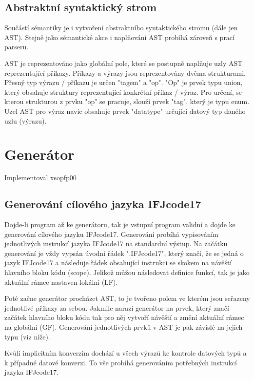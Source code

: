 \documentclass[11pt,a4paper]{article}
\begin{document}
    \subsection{Abstraktní syntaktický strom}
    Součástí sémantiky je i vytvoření abstraktního syntaktického stromu (dále jen AST). Stejně jako sémantické akce i naplňování AST probíhá zároveň s prací parseru.

    AST je reprezentováno jako globální pole, které se postupně naplňuje uzly AST reprezentující příkazy. Příkazy a výrazy jsou reprezentovány dvěma strukturami. Přesný typ výrazu / příkazu je určen "tagem" a "op". "Op" je prvek typu union, který obsahuje struktury reprezentující konkrétní příkaz / výraz. Pro určení, se kterou strukturou z prvku "op" se pracuje, slouží prvek "tag", který je typu enum. Uzel AST pro výraz navíc obsahuje prvek "datatype" určující datový typ daného uzlu (výrazu). \cite{AST:AST_in_C}

	\newpage


\section{Generátor}
    Implementoval xsopfp00

    \subsection{Generování cílového jazyka IFJcode17}
    Dojde-li program až ke generátoru, tak je vstupní program validní a dojde ke generování cílového jazyku IFJcode17. Generování probíhá vypisováním jednotlivých instrukcí jazyka IFJcode17 na standardní výstup. Na začátku generování je vždy vypsán úvodní řádek ".IFJcode17", který značí, že se jedná o jazyk IFJcode17 a následuje řádek obsahující instrukci se skokem na návěští hlavního bloku kódu (scope). Jelikož můžou následovat definice funkcí, tak je jako aktuální rámce nastaven lokální (LF).


    Poté začne generátor procházet AST, to je tvořeno polem ve kterém jsou seřazeny jednotlivé příkazy za sebou. Jakmile narazí generátor na prvek, který značí začátek hlavního bloku kódu tak pro něj vytvoří návěští a změní aktuální rámec na globální (GF). Generování jednotlivých prvků v AST je pak závislé na jejich typu (viz níže).

    Kvůli implicitním konverzím dochází u všech výrazů ke kontrole datových typů a k případné datové konverzi. To vše probíhá generováním potřebných instrukcí jazyka IFJcode17.
\end{document}
